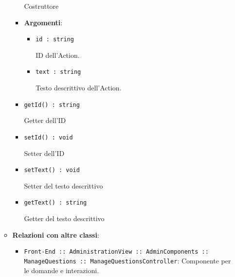 \documentclass[../DefinizioneDiProdotto.tex]{subfiles}
\begin{document}
\begin{itemize}
\begin{itemize}
\begin{itemize}
	 Costruttore

	\item \textbf{Argomenti}:
	\begin{itemize}
	\item \texttt{id : string}\

	 ID dell'Action.
	\item \texttt{text : string}\

	 Testo descrittivo dell'Action.
	\end{itemize}
	\end{itemize}\vspace{0.5em}
	\begin{itemize}
	\item \texttt{getId() : string}\

	 Getter dell'ID
	\end{itemize}\vspace{0.5em}
	\begin{itemize}
	\item \texttt{setId() : void}\

	 Setter dell'ID
	\end{itemize}\vspace{0.5em}
	\begin{itemize}
	\item \texttt{setText() : void}\

	 Setter del testo descrittivo
	\end{itemize}\vspace{0.5em}
	\begin{itemize}
	\item \texttt{getText() : string}\

	 Getter del testo descrittivo
	\end{itemize}\vspace{0.5em}
	\item \textbf{Relazioni con altre classi}:
	\begin{itemize}
	\item \texttt{Front-End :: AdministrationView :: AdminComponents :: ManageQuestions :: ManageQuestionsController}: Componente per le domande e interazioni.
	\end{itemize}

	\end{itemize}

	\newpage

\end{itemize}
\end{document}
